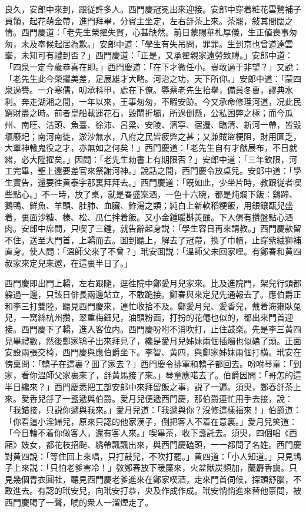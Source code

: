 良久，安郎中來到，跟従許多人。西門慶冠冕出來迎接。安郎中穿着粧花雲鷺補子員領，起花萌金帶，進門拜畢，分賓主坐定，左右㧱茶上來。茶罷，敍其間闊之情。西門慶道：「老先生榮擢失賀，心甚缺然。前日蒙賜華札厚儀，生正値喪事匆匆，未及奉候起居為歉。」安郎中道：「學生有失吊問，罪罪。生到京也曾道達雲峯，未知可有禮到否？」西門慶道：「正是，又承翟親家遠勞致賻。」安郎中道：「四泉一定今歲恭喜在即。」西門慶道：「在下才微任小。豈敢過于非望？」又說：「老先生此今榮擢美差，足展雄才大略。河治之功，天下所仰。」安郎中道：「蒙四泉過譽。一介寒儒，叨承科甲，處在下僚。辱蔡老先生抬擧，備員冬曹，謬典水利。奔走湖湘之間，一年以來，王事匆匆，不暇安跡。今又承命修理河道，况此民窮財盡之時。前者皇船載運花石，毀閘折壩，所過倒懸，公私困弊之極；而今瓜州、南旺、沽頭、魚臺、徐沛、呂梁、安陵、濟寜、宿遷、臨清、新河一帶，皆毀壞廢圯；南河南徙，淤沙無水，八府之民皆疲弊之甚；又兼賊盜梗阻，財用匱乏，大覃神輸鬼役之才，亦無如之何矣！」西門慶道：「老先生自有才猷展布，不日就緒，必大陞擢矣。」因問：「老先生勅書上有期限否？」安郎中道：「三年欽限，河工完畢，聖上還要差官來祭謝河神。」說話之間，西門慶令放桌兒。安郎中道：「學生實告，還要徃黄泰宇那裏拜拜去。」西門慶道：「旣如此，少坐片時，教跟従者喫些點心。」不一時，放了桌，就是春盛案酒，一色十六碗，都是炖爛下飯：鷄蹄、鵝鴨、鮮魚、羊頭、肚肺、血臟、鮓湯之類；純白上新軟稻粳飯，用銀鑲甌兒盛着，裏面沙糖、榛、松、瓜仁拌着飯。又小金鍾暖斟羙釀。下人俱有攢盤點心酒肉。安郎中席間，只喫了三鍾，就告辭起身説：「學生容日再來請教。」西門慶款留不住，送至大門首，上轎而去。囬到聽上，解去了冠帶，換了巾幘，止穿紫絨獅補直身。使人問：「溫師父來了不曾？」玳安囬説：「溫師父未回家哩。有鄭春和黄四叔家來定兒來邀，在這裏半日了。」

西門慶即出門上轎，左右跟隨，逕徃院中鄭愛月兒家來。比及進院門，架兒行頭都躱過一邊，只該日俳長兩邊站立，不敢跪接。鄭春與來定兒先通報去了。應伯爵正和李三打雙陸，聽見西門慶來，連忙收拾不及。鄭愛月兒、愛香兒，戴着海獺臥兔兒，一窝絲杭州攢，翠重梅鈿兒，油頭粉面，打扮的花僊也似的，都出來門首迎接。西門慶下了轎，進入客位内。西門慶吩咐不消吹打，止住鼓楽。先是李三黄四見畢禮數，然後鄭家鴇子出來拜見了，纔是愛月兒姊妹兩個插燭也似磕了頭。正面安設兩張交椅，西門慶與應伯爵坐下。李智、黄四，與鄭家姊妹兩個打横。玳安在傍稟問：「轎子在這裏？囬了家去？」西門慶令排軍和轎子都回去。吩咐琴童：「到家，看你溫師父家裏來了，㧱黄馬接了來。」琴童應喏去了。伯爵因問：「哥怎的這半日纔來？」西門慶悉把工部安郎中來拜留飯之事，説了一遍。須臾，鄭春㧱茶上來。愛香兒㧱了一盞遞與伯爵。愛月兒便遞西門慶，那伯爵連忙用手去接，說：「我錯接，只説你遞與我來。」愛月兒道：「我遞與你？沒修這樣福來！」伯爵道：「你看這小淫婦兒，原來只認的他家漢子，倒把客人不着在意裏。」愛月兒笑道：「今日輪不着你做客人，還有客人來。」喫畢茶，收下盞託去。須臾，四個唱《西廂》妓女，都花枝招颭、綉帶飄飄出來，與西門慶磕頭，一一都問了名姓。西門慶對黄四說：「等住回上來唱，只打鼓兒，不吹打罷。」黄四道：「小人知道。」只見鴇子上來説：「只怕老爹害冷！」敎鄭春放下暖簾來，火盆獸炭頻加，蘭麝香靄。只見幾個青衣圓社，聽見西門慶老爹進來在鄭家喫酒，走來門首伺候，探頭舒腦，不敢進去。有認的玳安兒，向玳安打恭，央及作成作成。玳安悄悄進來替他禀問，被西門慶喝了一聲，唬的衆人一溜煙走了。

